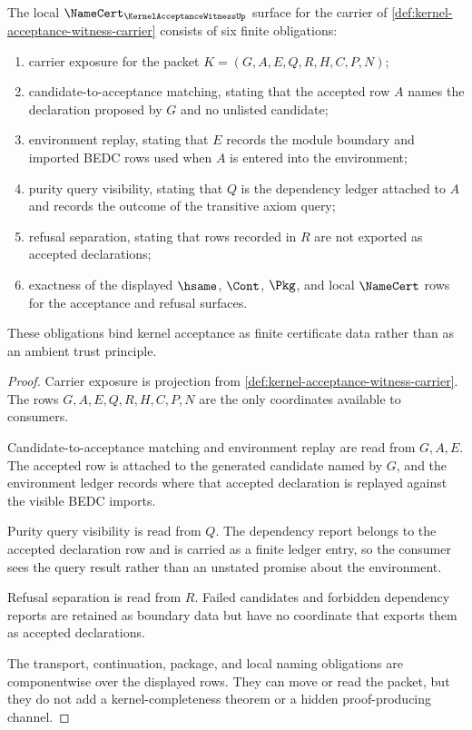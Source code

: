 \begin{theorem}
\label{thm:kernel-acceptance-witness-namecert-obligations}
The local $\NameCert_{\KernelAcceptanceWitnessUp}$ surface for the carrier of \autoref{def:kernel-acceptance-witness-carrier} consists of six finite obligations:
\begin{enumerate}
\item carrier exposure for the packet $K=(G,A,E,Q,R,H,C,P,N)$;
\item candidate-to-acceptance matching, stating that the accepted row $A$ names the declaration proposed by $G$ and no unlisted candidate;
\item environment replay, stating that $E$ records the module boundary and imported BEDC rows used when $A$ is entered into the environment;
\item purity query visibility, stating that $Q$ is the dependency ledger attached to $A$ and records the outcome of the transitive axiom query;
\item refusal separation, stating that rows recorded in $R$ are not exported as accepted declarations;
\item exactness of the displayed $\hsame$, $\Cont$, $\Pkg$, and local $\NameCert$ rows for the acceptance and refusal surfaces.
\end{enumerate}
These obligations bind kernel acceptance as finite certificate data rather than as an ambient trust principle.
\end{theorem}
\begin{proof}
Carrier exposure is projection from \autoref{def:kernel-acceptance-witness-carrier}. The rows $G,A,E,Q,R,H,C,P,N$ are the only coordinates available to consumers.

Candidate-to-acceptance matching and environment replay are read from $G,A,E$. The accepted row is attached to the generated candidate named by $G$, and the environment ledger records where that accepted declaration is replayed against the visible BEDC imports.

Purity query visibility is read from $Q$. The dependency report belongs to the accepted declaration row and is carried as a finite ledger entry, so the consumer sees the query result rather than an unstated promise about the environment.

Refusal separation is read from $R$. Failed candidates and forbidden dependency reports are retained as boundary data but have no coordinate that exports them as accepted declarations.

The transport, continuation, package, and local naming obligations are componentwise over the displayed rows. They can move or read the packet, but they do not add a kernel-completeness theorem or a hidden proof-producing channel.
\end{proof}

